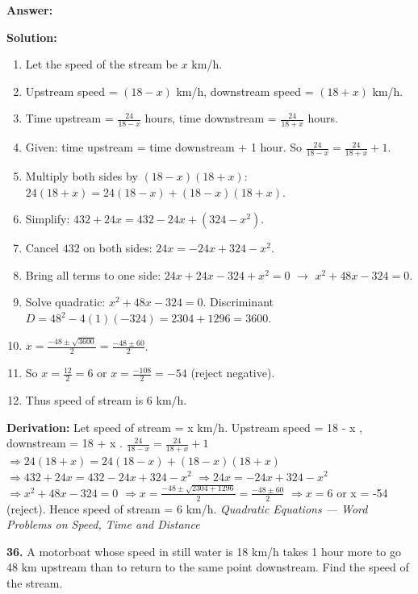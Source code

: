 \documentclass[12pt,a4paper]{exam}
\newcommand{\fitmath}[1]{%
  \sbox{\schmathbox}{$\displaystyle #1$}%
  \ifdim\wd\schmathbox>\linewidth
    \resizebox{\linewidth}{!}{\usebox{\schmathbox}}%
  \else
    \usebox{\schmathbox}%
  \fi}
\begin{document}
\begin{questions}
\textbf{Answer:}
\begin{center}
\fitmath{\text{Speed of the stream is} 6 km/h.}
\end{center}

\textbf{Solution:}
\begin{enumerate}
  \item Let the speed of the stream be $x$ km/h.
  \item Upstream speed = $(18 - x)$ km/h, downstream speed = $(18 + x)$ km/h.
  \item Time upstream = $\frac{24}{18 - x}$ hours, time downstream = $\frac{24}{18 + x}$ hours.
  \item Given: time upstream = time downstream + 1 hour. So $\frac{24}{18 - x} = \frac{24}{18 + x} + 1$.
  \item Multiply both sides by $(18 - x)(18 + x)$: $24(18 + x) = 24(18 - x) + (18 - x)(18 + x)$.
  \item Simplify: $432 + 24x = 432 - 24x + (324 - x^2)$.
  \item Cancel $432$ on both sides: $24x = -24x + 324 - x^2$.
  \item Bring all terms to one side: $24x + 24x - 324 + x^2 = 0$ $\to$ $x^2 + 48x - 324 = 0$.
  \item Solve quadratic: $x^2 + 48x - 324 = 0$. Discriminant $D = 48^2 - 4(1)(-324) = 2304 + 1296 = 3600$.
  \item $x = \frac{-48 \pm \sqrt{3600}}{2} = \frac{-48 \pm 60}{2}$.
  \item So $x = \frac{12}{2} = 6$ or $x = \frac{-108}{2} = -54$ (reject negative).
  \item Thus speed of stream is $6$ km/h.
\end{enumerate}
\textbf{Derivation:}
Let speed of stream =  x  km/h.
Upstream speed =  18 - x , downstream =  18 + x .
 $\frac{24}{18 - x} = \frac{24}{18 + x} + 1$ 
 $\Rightarrow 24(18 + x) = 24(18 - x) + (18 - x)(18 + x)$ 
 $\Rightarrow 432 + 24x = 432 - 24x + 324 - x^2$ 
 $\Rightarrow 24x = -24x + 324 - x^2$ 
 $\Rightarrow x^2 + 48x - 324 = 0$ 
 $\Rightarrow x = \frac{-48 \pm \sqrt{2304 + 1296}}{2} = \frac{-48 \pm 60}{2}$ 
 $\Rightarrow x = 6$  or  x = -54  (reject).
Hence speed of stream =  6  km/h.
\hfill \textit{Quadratic Equations — Word Problems on Speed, Time and Distance}
\vspace{0.3cm}

\question \textbf{36.} A motorboat whose speed in still water is 18 km/h takes 1 hour more to go 48 km upstream than to return to the same point downstream. Find the speed of the stream.


\end{questions}
\end{document}
